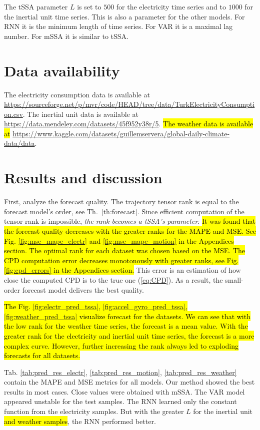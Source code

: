 \documentclass[referee, pdflatex, sn-mathphys-num]{sn-jnl}
\theoremstyle{definition}
\theoremstyle{plain}
\begin{document}
	The tSSA parameter $ L $ is set to $ 500 $ for the electricity time series and to $ 1000 $ for the inertial unit time series. This is also a parameter for the other models. For RNN it is the minimum length of time series. For VAR it is a maximal lag number. For mSSA it is similar to tSSA.
	
	\section{Data availability}
	
	The electricity consumption data is available at \url{https://sourceforge.net/p/mvr/code/HEAD/tree/data/TurkElectricityConsumption.csv}. The inertial unit data is available at \url{https://data.mendeley.com/datasets/45f952y38r/5}. \hl{The weather data is available at} \url{https://www.kaggle.com/datasets/guillemservera/global-daily-climate-data/data}.
	
	\section{Results and discussion}
	
		First, analyze the forecast quality. The trajectory tensor rank is equal to the forecast model's order, see Th.~\ref{th:forecast}. Since efficient computation of the tensor rank is impossible, \emph{the rank becomes a tSSA's parameter}. \hl{It was found that the forecast quality decreases with the greater ranks for the MAPE and MSE. See Fig. {\ref{fig:mse_mape_electr}} and {\ref{fig:mse_mape_motion}} in the Appendices section. The optimal rank for each dataset was chosen based on the MSE. The CPD computation error decreases monotonously with greater ranks, see Fig. {\ref{fig:cpd_errors}} in the Appendices section.} This error is an estimation of how close the computed CPD is to the true one (\ref{eq:CPD}). As a result, the small-order forecast model delivers the best quality.
	
	\hl{The Fig. {\ref{fig:electr_pred_tssa}}, {\ref{fig:accel_gyro_pred_tssa}}, {\ref{fig:weather_pred_tssa}} visualize forecast for the datasets. We can see that with the low rank for the weather time series, the forecast is a mean value. With the greater rank for the electricity and inertial unit time series, the forecast is a more complex curve. However, further increasing the rank always led to exploding forecasts for all datasets.}
	
	Tab. \ref{tab:pred_res_electr}, \ref{tab:pred_res_motion}, \ref{tab:pred_res_weather} contain the MAPE and MSE metrics for all models. Our method showed the best results in most cases. Close values were obtained with mSSA. The VAR model appeared unstable for the test samples. The RNN learned only the constant function from the electricity samples. But with the greater $ L $ for the inertial unit \hl{and weather samples}, the RNN performed better.
	
\end{document}
